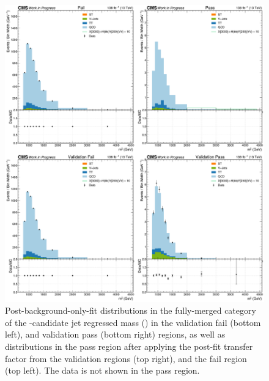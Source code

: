 \begin{figure}[hbt!]
\centering
\includegraphics[width=\textwidth]{figures/05-HH/results_res/postfit_DijetMass.pdf}
\caption[Post-background-only-fit distributions in the fully-merged category of the \VV-candidate jet regressed mass (\mregvv).]{Post-background-only-fit distributions in the fully-merged category of the \VV-candidate jet regressed mass (\mregvv) in the validation fail (bottom left), and validation pass (bottom right) regions, as well as distributions in the pass region after applying the post-fit transfer factor from the validation regions (top right), and the fail region (top left).
The data is not shown in the pass region.
\label{fig:05_results_xhy_postfit_fm_mvv}
}
\end{figure}

